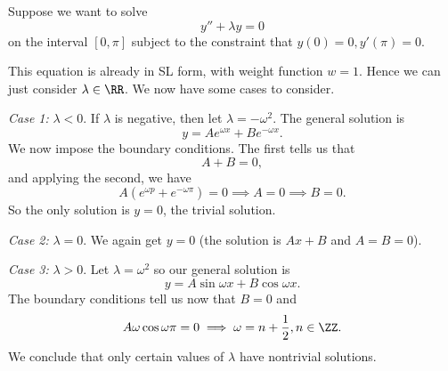 \begin{exm}
    Suppose we want to solve
    \begin{equation}
        y'' + \lambda y = 0
    \end{equation}
    on the interval $[0,\pi]$ subject to the constraint that $y(0)=0, y'(\pi)=0$.
    
    This equation is already in SL form, with weight function $w=1$. Hence we can just consider $\lambda \in \RR$. We now have some cases to consider.
    
    \emph{Case 1:} $\lambda <0$. If $\lambda$ is negative, then let $\lambda = -\omega^2$. The general solution is
    \begin{equation}
        y=Ae^{\omega x} + Be^{-\omega x}.
    \end{equation}
    We now impose the boundary conditions. The first tells us that
    \begin{equation}
        A+B =0,
    \end{equation}
    and applying the second, we have
    \begin{equation}
        A(e^{\omega p } + e^{-\omega \pi}) = 0 \implies A= 0 \implies B=0.
    \end{equation}
    So the only solution is $y=0$, the trivial solution.
    
    \emph{Case 2:} $\lambda=0$. We again get $y=0$ (the solution is $Ax+B$ and $A=B=0$).
    
    \emph{Case 3:} $\lambda >0$. Let $\lambda = \omega^2$ so our general solution is
    \begin{equation}
        y=A\sin\omega x+ B\cos\omega x.
    \end{equation}
    The boundary conditions tell us now that $B=0$ and
    \begin{equation}
        A\omega \cos \omega \pi =0 \implies \omega = n+\frac{1}{2}, n\in \ZZ.
    \end{equation}
    We conclude that only certain values of $\lambda$ have nontrivial solutions.
\end{exm}
